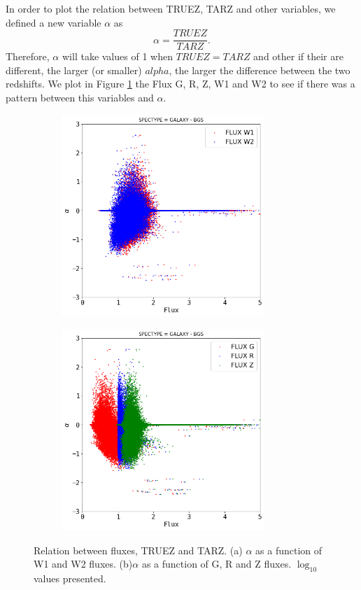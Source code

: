\documentclass[]{article}
\begin{document}
In order to plot the relation between TRUEZ, TARZ and other variables, we defined a new variable $\alpha$ as
\begin{equation}
\alpha = \frac{TRUEZ}{TARZ}.
\end{equation}
Therefore, $\alpha$ will take values of 1 when $TRUEZ = TARZ$ and other if their are different, the larger (or smaller) $alpha$, the larger the difference between the two redshifts. We plot in Figure \ref{fig:BGS-FLUX-ALPHA} the Flux G, R, Z, W1 and W2 to see if there was a pattern between this variables and $\alpha$. 
\begin{figure}[!htp]
	\centering
	\begin{subfigure}[t]{0.5\textwidth}
		\centering
		\includegraphics[height=3in]{TeX_files/Imagenes/BGS-FLUXW-ALPHA}
		\caption{}
	\end{subfigure}%
	\begin{subfigure}[t]{0.5\textwidth}
		\centering
		\includegraphics[height=3in]{TeX_files/Imagenes/BGS-FLUXRGZ-ALPHA}
		\caption{}
	\end{subfigure}
	\caption{Relation between fluxes, TRUEZ and TARZ. (a) $\alpha$ as a function of W1 and W2 fluxes. (b)$\alpha$ as a function of G, R and Z fluxes. $\log_{10}$ values presented.}
	\label{fig:BGS-FLUX-ALPHA}
\end{figure} 
\end{document}
